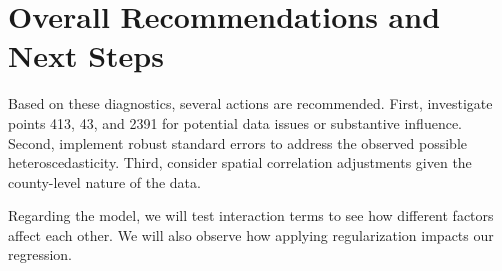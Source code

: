 \documentclass[
]{article}
\newenvironment{Shaded}{\begin{snugshade}}{\end{snugshade}}
\newcommand{\AttributeTok}[1]{\textcolor[rgb]{0.13,0.29,0.53}{#1}}
\newcommand{\DecValTok}[1]{\textcolor[rgb]{0.00,0.00,0.81}{#1}}
\newcommand{\FunctionTok}[1]{\textcolor[rgb]{0.13,0.29,0.53}{\textbf{#1}}}
\newcommand{\NormalTok}[1]{#1}
\newcommand{\OtherTok}[1]{\textcolor[rgb]{0.56,0.35,0.01}{#1}}
\newcommand{\SpecialCharTok}[1]{\textcolor[rgb]{0.81,0.36,0.00}{\textbf{#1}}}
\newcommand{\StringTok}[1]{\textcolor[rgb]{0.31,0.60,0.02}{#1}}
\begin{document}
\section{Overall Recommendations and Next
Steps}\label{overall-recommendations-and-next-steps}

Based on these diagnostics, several actions are recommended. First,
investigate points 413, 43, and 2391 for potential data issues or
substantive influence. Second, implement robust standard errors to
address the observed possible heteroscedasticity. Third, consider
spatial correlation adjustments given the county-level nature of the
data.

Regarding the model, we will test interaction terms to see how different
factors affect each other. We will also observe how applying
regularization impacts our regression.

\begin{Shaded}
\end{Shaded}
\end{document}
